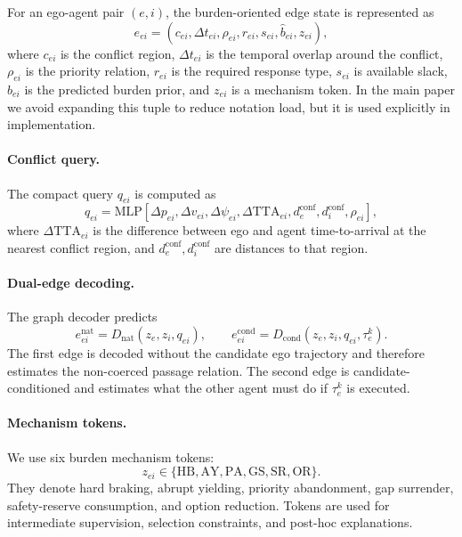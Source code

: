 \documentclass[10pt]{article}
\begin{document}
For an ego-agent pair $(e,i)$, the burden-oriented edge state is represented as
\begin{equation}
    e_{ei}
    =
    (
    c_{ei},
    \Delta t_{ei},
    \rho_{ei},
    r_{ei},
    s_{ei},
    \widehat{b}_{ei},
    z_{ei}
    ),
\end{equation}
where $c_{ei}$ is the conflict region, $\Delta t_{ei}$ is the temporal overlap around the conflict, $\rho_{ei}$ is the priority relation, $r_{ei}$ is the required response type, $s_{ei}$ is available slack, $\widehat{b}_{ei}$ is the predicted burden prior, and $z_{ei}$ is a mechanism token. In the main paper we avoid expanding this tuple to reduce notation load, but it is used explicitly in implementation.

\paragraph{Conflict query.}
The compact query $q_{ei}$ is computed as
\begin{equation}
    q_{ei}
    =
    \mathrm{MLP}
    \left[
    \Delta p_{ei},
    \Delta v_{ei},
    \Delta \psi_{ei},
    \Delta \mathrm{TTA}_{ei},
    d^{\mathrm{conf}}_{e},
    d^{\mathrm{conf}}_{i},
    \rho_{ei}
    \right],
\end{equation}
where $\Delta \mathrm{TTA}_{ei}$ is the difference between ego and agent time-to-arrival at the nearest conflict region, and $d^{\mathrm{conf}}_e,d^{\mathrm{conf}}_i$ are distances to that region.

\paragraph{Dual-edge decoding.}
The graph decoder predicts
\begin{equation}
    e^{\mathrm{nat}}_{ei}
    =
    D_{\mathrm{nat}}(z_e,z_i,q_{ei}),
    \qquad
    e^{\mathrm{cond}}_{ei}
    =
    D_{\mathrm{cond}}(z_e,z_i,q_{ei},\tau^k_e).
\end{equation}
The first edge is decoded without the candidate ego trajectory and therefore estimates the non-coerced passage relation. The second edge is candidate-conditioned and estimates what the other agent must do if $\tau^k_e$ is executed.

\paragraph{Mechanism tokens.}
We use six burden mechanism tokens:
\begin{equation}
    z_{ei}\in
    \{
    \mathrm{HB},
    \mathrm{AY},
    \mathrm{PA},
    \mathrm{GS},
    \mathrm{SR},
    \mathrm{OR}
    \}.
\end{equation}
They denote hard braking, abrupt yielding, priority abandonment, gap surrender, safety-reserve consumption, and option reduction. Tokens are used for intermediate supervision, selection constraints, and post-hoc explanations.
\end{document}
